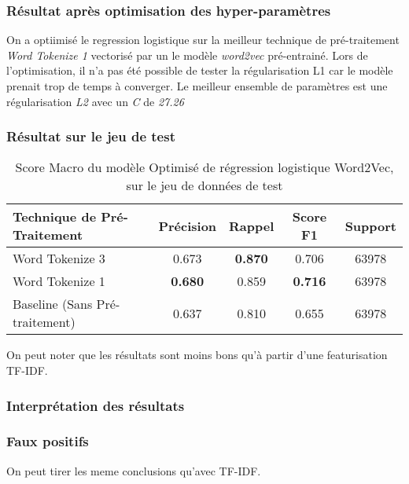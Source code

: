 \subsubsection{Résultat après optimisation des hyper-paramètres}
On a optiimisé le regression logistique sur la meilleur technique de pré-traitement \textit{Word Tokenize 1} vectorisé par un le modèle \textit{word2vec} pré-entrainé.
Lors de l'optimisation, il n'a pas été possible de tester la régularisation L1 car le modèle prenait trop de temps à converger. 
Le meilleur ensemble de paramètres est une régularisation \textit{L2 }avec un \textit{C} de \textit{27.26}

\subsubsection{Résultat sur le jeu de test}
\begin{table}[ht]
    \centering
    \caption{Score Macro du modèle Optimisé de régression logistique Word2Vec, sur le jeu de données de test}
    \begin{tabular}{lcccc}
    \hline
    \textbf{Technique de Pré-Traitement} & \textbf{Précision} & \textbf{Rappel} & \textbf{Score F1} & \textbf{Support} \\ \hline
    Word Tokenize 3                          & 0.673              & \textbf{0.870}           & 0.706            & 63978            \\\hline
    Word Tokenize 1                          & \textbf{0.680}              & 0.859           & \textbf{0.716}             & 63978            \\\hline
    Baseline (Sans Pré-traitement)           & 0.637              & 0.810           & 0.655             & 63978            \\ \hline
\end{tabular}
\label{tab:results}
\end{table}

On peut noter que les résultats sont moins bons qu'à partir d'une featurisation TF-IDF.

\subsubsection{Interprétation des résultats}
\subsubsection{Faux positifs}
On peut tirer les meme conclusions qu'avec TF-IDF. 

